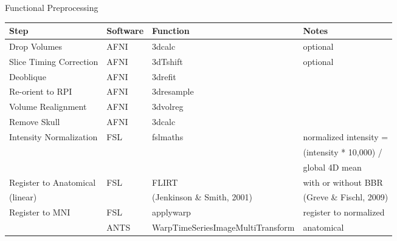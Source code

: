 Functional Preprocessing \\

\begin{tabular}{| l | l | l | p{3.5cm} |}
	\hline
	Step & Software  & Function & Notes \\ \hline
	Drop Volumes & AFNI & 3dcalc & optional\\ \hline
	Slice Timing Correction & AFNI & 3dTshift & optional \\ \hline
	Deoblique & AFNI & 3drefit & \\ \hline
	Re-orient to RPI & AFNI & 3dresample & \\ \hline
	Volume Realignment & AFNI & 3dvolreg & \\ \hline
	Remove Skull  & AFNI & 3dcalc & \\ \hline
	Intensity Normalization & FSL & fslmaths & normalized intensity = \\ & & & (intensity * 10,000) / \\ & & & global 4D mean \\ \hline
	Register to Anatomical & FSL & FLIRT & with or without BBR \\ (linear) & & (Jenkinson \& Smith, 2001) & (Greve \& Fischl, 2009)\\ \hline
	Register to MNI & FSL & applywarp & register to normalized \\ \cline{2-3}
	& ANTS & WarpTimeSeriesImageMultiTransform & anatomical \\ 
	\hline
\end{tabular}
